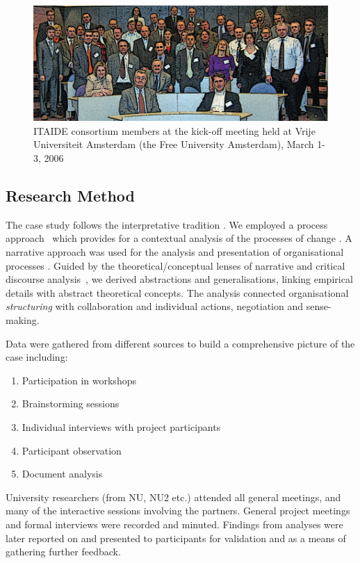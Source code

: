 \documentclass[graybox]{styles/svmult}
\begin{document}
%
\begin{figure}[b]
\includegraphics[width=\textwidth]{figs/ITAIDE_kick-off_group.png}
%
%
\caption{ITAIDE consortium members at the kick-off meeting held at Vrije Universiteit Amsterdam (the Free University Amsterdam), March 1-3, 2006}
\label{fig:consortium}       %
\end{figure}

\subsection{Research Method}
\label{sec:method}
The case study follows the interpretative tradition \citep{Wal1995aa, Mye1997aa}. 
We employed a process approach~\citep{MarRob1988aa} which provides for a contextual analysis of the processes of change \citep{Pet1985aa}.
A narrative approach was used for the analysis and presentation of organisational processes \citep{pentland1999building}.
Guided by the theoretical/conceptual lenses of narrative and critical discourse analysis~\citep{boland1995perspective, phillips2012organizational}, we derived abstractions and generalisations, linking empirical details with abstract theoretical concepts. 
The analysis connected organisational \textit{structuring} with collaboration and individual actions, negotiation and sense-making. 

Data were gathered from different sources to build a comprehensive picture of the case including: 
\begin{enumerate}
\item Participation in workshops
\item Brainstorming sessions
\item Individual interviews with project participants
\item Participant observation
\item Document analysis
\end{enumerate}
University researchers (from NU, NU2 etc.) attended all general meetings, and many of the interactive sessions involving the partners. 
General project meetings and formal interviews were recorded and minuted. 
Findings from analyses were later reported on and presented to participants for validation and as a means of gathering further feedback.
\end{document}
